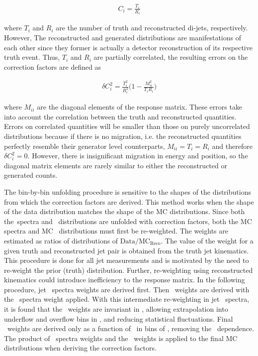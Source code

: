 \begin{eqnarray}
C_{i} = \frac{T_{i}}{R_{i}}
\label{eqn:factors}
\end{eqnarray}

where $T_{i}$ and $R_{i}$ are the number of truth and reconstructed di-jets, respectively.  However, The reconstructed and generated distributions are manifestations of each other since they former is actually a detector reconstruction of its respective truth event. Thus, $T_{i}$ and $R_{i}$ are partially correlated, the resulting errors on the correction factors are defined as

\begin{eqnarray}
\delta C_{i}^{2} = \frac{T_{i}^{2}}{R_{i}^{3}}\bigg(1-\frac{M_{ii}^{2}}{T_{i}R_{i}}\bigg)
\label{eqn:factorserrors}
\end{eqnarray}

where $M_{ii}$ are the diagonal elements of the response matrix. These errors take into account the correlation between the truth and reconstructed quantities. Errors on correlated quantities will be smaller than those on purely uncorrelated distributions because if there is no migration, i.e. the reconstructed quantities perfectly resemble their generator level counterparts, $M_{ii}=T_{i}=R_{i}$ and therefore $\delta C_{i}^{2} = 0$. However, there is insignificant migration in energy and position, so the diagonal matrix elements are rarely similar to either the reconstructed or generated counts.

The bin-by-bin unfolding procedure is sensitive to the shapes of the distributions from which the correction factors are derived. This method works when the shape of the data distribution matches the shape of the MC distributions. Since both the\pt\ spectra and \Dphi\ distributions are unfolded with correction factors, both the MC spectra and MC \Dphi\ distributions must first be re-weighted. The weights are estimated as ratios of distributions of $\mathrm{Data/MC_{Reco}}$. The value of the weight for a given truth and reconstructed jet pair is obtained from the truth jet kinematics. This procedure is done for all jet measurements and is motivated by the need to re-weight the prior (truth) distribution. Further, re-weighting using reconstructed kinematics could introduce inefficiency to the response matrix. In the following procedure, jet \pt\ spectra weights are derived first. Then \Dphi\ weights are derived with the \pt\ spectra weight applied. With this intermediate re-weighting in jet \pt\ spectra, it is found that the \Dphi\ weights are invariant in \pT, allowing extrapolation into underflow and overflow bins in \pT, and reducing statistical fluctuations. Final \Dphi\ weights are derived only as a function of \Dphi\ in bins of \ystar, removing the \pT\ dependence. The product of \pt\ spectra weights and the \Dphi\ weights is applied to the final MC distributions when deriving the correction factors.

